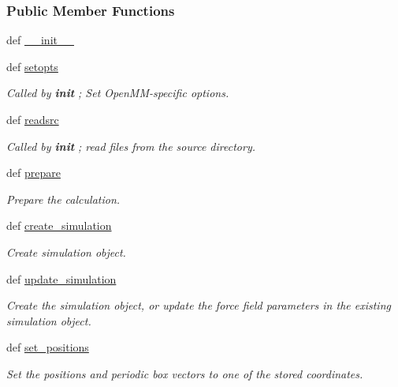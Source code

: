 \subsubsection*{Public Member Functions}
\begin{DoxyCompactItemize}
\item 
def \hyperlink{classforcebalance_1_1openmmio_1_1OpenMM_a6b2e2a3ca1538926457ed9667b80f4fc}{\-\_\-\-\_\-init\-\_\-\-\_\-}
\item 
def \hyperlink{classforcebalance_1_1openmmio_1_1OpenMM_ad5a2e26915ffecb0102d3879a0c95342}{setopts}
\begin{DoxyCompactList}\small\item\em Called by {\bfseries init} ; Set Open\-M\-M-\/specific options. \end{DoxyCompactList}\item 
def \hyperlink{classforcebalance_1_1openmmio_1_1OpenMM_a4c7e0b4c7f7b589ba1761f03160f5572}{readsrc}
\begin{DoxyCompactList}\small\item\em Called by {\bfseries init} ; read files from the source directory. \end{DoxyCompactList}\item 
def \hyperlink{classforcebalance_1_1openmmio_1_1OpenMM_ac8502318fa256ff8e4b244dde62616e4}{prepare}
\begin{DoxyCompactList}\small\item\em Prepare the calculation. \end{DoxyCompactList}\item 
def \hyperlink{classforcebalance_1_1openmmio_1_1OpenMM_af18bb3c46f5367353758df103f459c25}{create\-\_\-simulation}
\begin{DoxyCompactList}\small\item\em Create simulation object. \end{DoxyCompactList}\item 
def \hyperlink{classforcebalance_1_1openmmio_1_1OpenMM_a8f584613e1512c0963c62427f759c8b0}{update\-\_\-simulation}
\begin{DoxyCompactList}\small\item\em Create the simulation object, or update the force field parameters in the existing simulation object. \end{DoxyCompactList}\item 
def \hyperlink{classforcebalance_1_1openmmio_1_1OpenMM_a77e08b50b78e299cc6c80c09ea4975a6}{set\-\_\-positions}
\begin{DoxyCompactList}\small\item\em Set the positions and periodic box vectors to one of the stored coordinates. \end{DoxyCompactList}\item 

\end{DoxyCompactItemize}
